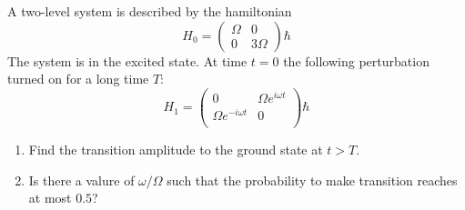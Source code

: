 \begin{esercizio}%
   A two-level system is described by the hamiltonian
   \begin{equation*}
      H_0=
      \begin{pmatrix}
         \Omega & 0\\
         0 & 3\Omega
      \end{pmatrix}
      \hbar
   \end{equation*}
   The system is in the excited state. At time $t=0$ the following perturbation turned on for a long time $T$:
   \begin{equation*}
      H_1=
      \begin{pmatrix}
         0 & \Omega e^{i\omega t}\\
         \Omega e^{-i\omega t} & 0\\
      \end{pmatrix}
      \hbar
   \end{equation*}
   \begin{enumerate}[label=\alph*), leftmargin=0.6cm]
      \item Find the transition amplitude to the ground state at $t>T$.
      \item Is there a valure of $\omega/\Omega$ such that the probability to make transition reaches at most $0.5$?
   \end{enumerate}
\end{esercizio}
